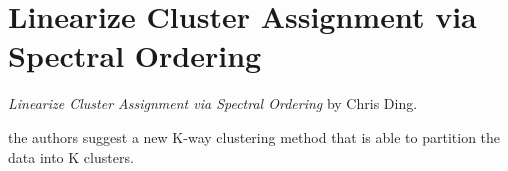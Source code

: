 \section{Linearize Cluster Assignment via Spectral Ordering}

\textit{Linearize Cluster Assignment via Spectral Ordering} by Chris Ding.
\newline

the authors suggest a new K-way clustering method that is able to partition the data into K clusters.


